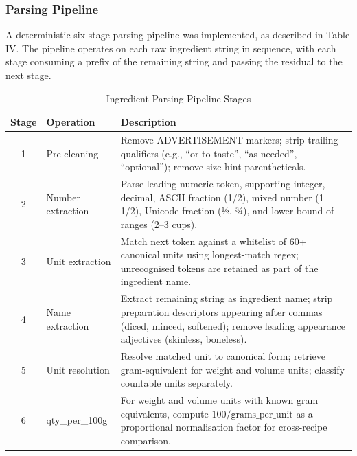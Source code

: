 \documentclass[conference]{IEEEtran}
\begin{document}
\subsubsection{Parsing Pipeline}
A deterministic six-stage parsing pipeline was implemented, as described in Table IV. The pipeline operates on each raw ingredient string in sequence, with each stage consuming a prefix of the remaining string and passing the residual to the next stage.

\begin{table}[!t]
\caption{Ingredient Parsing Pipeline Stages}
\label{tab:ingredient_pipeline}
\centering
\footnotesize
\begin{tabular}{c l p{12cm}}
\toprule
\textbf{Stage} & \textbf{Operation} & \textbf{Description} \\
\midrule

1 & Pre-cleaning &
Remove ADVERTISEMENT markers; strip trailing qualifiers (e.g., ``or to taste'', ``as needed'', ``optional''); remove size-hint parentheticals. \\

2 & Number extraction &
Parse leading numeric token, supporting integer, decimal, ASCII fraction (1/2), mixed number (1 1/2), Unicode fraction (½, ¾), and lower bound of ranges (2--3 cups). \\

3 & Unit extraction &
Match next token against a whitelist of 60+ canonical units using longest-match regex; unrecognised tokens are retained as part of the ingredient name. \\

4 & Name extraction &
Extract remaining string as ingredient name; strip preparation descriptors appearing after commas (diced, minced, softened); remove leading appearance adjectives (skinless, boneless). \\

5 & Unit resolution &
Resolve matched unit to canonical form; retrieve gram-equivalent for weight and volume units; classify countable units separately. \\

6 & qty\_per\_100g &
For weight and volume units with known gram equivalents, compute $100/\text{grams\_per\_unit}$ as a proportional normalisation factor for cross-recipe comparison. \\

\bottomrule
\end{tabular}
\end{table}
\end{document}
